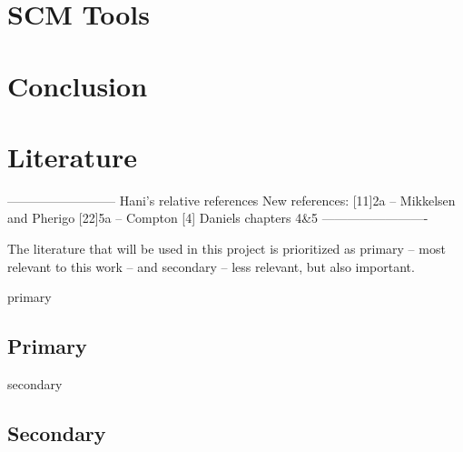 \documentclass[a4paper]{article}
\begin{document}
\section{SCM Tools}

\section{Conclusion}

\newpage
\appendix
\section{Literature}

--------------------------
Hani's relative references
New references:
[11]2a – Mikkelsen and Pherigo
[22]5a – Compton
[4] Daniels chapters 4\&5
-------------------------



The literature that will be used in this project is prioritized as primary -- most relevant to this work -- and secondary -- less relevant, but also important. 
\begin{btSect}[alpha]{primary}
\subsection{Primary}
\btPrintAll
\end{btSect}

\begin{btSect}[alpha]{secondary}
\subsection{Secondary}
\btPrintAll
\end{btSect}
\end{document}
